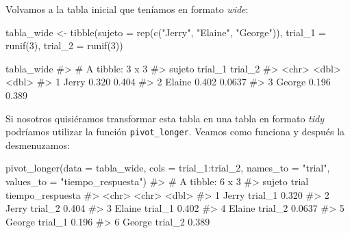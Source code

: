 \documentclass[
  letterpaper,
  DIV=11,
  numbers=noendperiod,
  oneside]{scrreprt}
\newenvironment{Shaded}{\begin{snugshade}}{\end{snugshade}}
\newcommand{\AttributeTok}[1]{\textcolor[rgb]{0.40,0.45,0.13}{#1}}
\newcommand{\CommentTok}[1]{\textcolor[rgb]{0.37,0.37,0.37}{#1}}
\newcommand{\DecValTok}[1]{\textcolor[rgb]{0.68,0.00,0.00}{#1}}
\newcommand{\FunctionTok}[1]{\textcolor[rgb]{0.28,0.35,0.67}{#1}}
\newcommand{\NormalTok}[1]{\textcolor[rgb]{0.00,0.23,0.31}{#1}}
\newcommand{\OtherTok}[1]{\textcolor[rgb]{0.00,0.23,0.31}{#1}}
\newcommand{\SpecialCharTok}[1]{\textcolor[rgb]{0.37,0.37,0.37}{#1}}
\newcommand{\StringTok}[1]{\textcolor[rgb]{0.13,0.47,0.30}{#1}}
\begin{document}
Volvamos a la tabla inicial que teníamos en formato \emph{wide}:

\begin{Shaded}
\begin{Highlighting}[]
\NormalTok{tabla\_wide }\OtherTok{\textless{}{-}} \FunctionTok{tibble}\NormalTok{(}\AttributeTok{sujeto  =} \FunctionTok{rep}\NormalTok{(}\FunctionTok{c}\NormalTok{(}\StringTok{"Jerry"}\NormalTok{, }\StringTok{"Elaine"}\NormalTok{, }\StringTok{"George"}\NormalTok{)),}
                     \AttributeTok{trial\_1 =} \FunctionTok{runif}\NormalTok{(}\DecValTok{3}\NormalTok{),}
                     \AttributeTok{trial\_2 =} \FunctionTok{runif}\NormalTok{(}\DecValTok{3}\NormalTok{)) }

\NormalTok{tabla\_wide}
\CommentTok{\#\textgreater{} \# A tibble: 3 x 3}
\CommentTok{\#\textgreater{}   sujeto trial\_1 trial\_2}
\CommentTok{\#\textgreater{}   \textless{}chr\textgreater{}    \textless{}dbl\textgreater{}   \textless{}dbl\textgreater{}}
\CommentTok{\#\textgreater{} 1 Jerry    0.320  0.404 }
\CommentTok{\#\textgreater{} 2 Elaine   0.402  0.0637}
\CommentTok{\#\textgreater{} 3 George   0.196  0.389}
\end{Highlighting}
\end{Shaded}

Si nosotros quisiéramos transformar esta tabla en una tabla en formato
\emph{tidy} podríamos utilizar la función
\texttt{pivot\_longer}.
Veamos como funciona y después la desmenuzamos:

\begin{Shaded}
\begin{Highlighting}[]
\FunctionTok{pivot\_longer}\NormalTok{(}\AttributeTok{data =}\NormalTok{ tabla\_wide, }
             \AttributeTok{cols =}\NormalTok{ trial\_1}\SpecialCharTok{:}\NormalTok{trial\_2, }
             \AttributeTok{names\_to =} \StringTok{"trial"}\NormalTok{,}
             \AttributeTok{values\_to =} \StringTok{"tiempo\_respuesta"}\NormalTok{)}
\CommentTok{\#\textgreater{} \# A tibble: 6 x 3}
\CommentTok{\#\textgreater{}   sujeto trial   tiempo\_respuesta}
\CommentTok{\#\textgreater{}   \textless{}chr\textgreater{}  \textless{}chr\textgreater{}              \textless{}dbl\textgreater{}}
\CommentTok{\#\textgreater{} 1 Jerry  trial\_1           0.320 }
\CommentTok{\#\textgreater{} 2 Jerry  trial\_2           0.404 }
\CommentTok{\#\textgreater{} 3 Elaine trial\_1           0.402 }
\CommentTok{\#\textgreater{} 4 Elaine trial\_2           0.0637}
\CommentTok{\#\textgreater{} 5 George trial\_1           0.196 }
\CommentTok{\#\textgreater{} 6 George trial\_2           0.389}
\end{Highlighting}
\end{Shaded}
\end{document}
